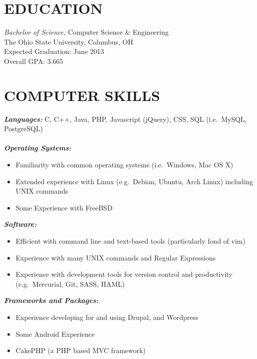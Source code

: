 \documentclass[line,margin=.2,letterpaper]{resume}
\begin{document}
\fancyhead{}
\fancyfoot{}
\renewcommand{\headrulewidth}{0pt}
\address{2092 Middlesex road, Columbus, OH 43220}
\address{\href{mailto:ryan@ryanmcg.com}{ryan@ryanmcg.com} -- (614) 678-4408}
\begin{resume}
\vspace{-.45in}
 
\section{\uppercase{Education}} {\sl Bachelor of Science,} Computer Science \& Engineering \\
		The Ohio State University, Columbus, OH \\
                Expected Graduation: June 2013 \\
		Overall GPA: 3.665 \\
\vspace{-.15in}
 
\section{\uppercase{Computer Skills}}
	{\sl\textbf{Languages:}}
	    C, C++, Java, PHP, Javascript (jQuery), CSS, SQL (i.e.~MySQL, PostgreSQL) \\ \\
	{\sl\textbf{Operating Systems: }} \hfill 
	    \begin{itemize}
		\item Familiarity with common operating systems (i.e.~Windows, Mac OS X)
		\item Extended experience with Linux (e.g.~Debian, Ubuntu, Arch Linux) including UNIX commands
		\item Some Experience with FreeBSD
	    \end{itemize}
	{\sl\textbf{Software:}} \hfill 
	    \begin{itemize}
		\item Efficient with command line and text-based tools (particularly fond of vim)
		\item Experience with many UNIX commands and Regular Expressions
		\item Experience with development tools for version control and productivity (e.g.~Mercurial, Git, SASS, HAML)
	    \end{itemize}
	{\sl\textbf{Frameworks and Packages:}} \hfill 
	    \begin{itemize}
		\item Experience developing for and using Drupal, and Wordpress
		\item Some Android Experience
                \item CakePHP (a PHP based MVC framework)
	    \end{itemize}



\end{resume}
\end{document}
